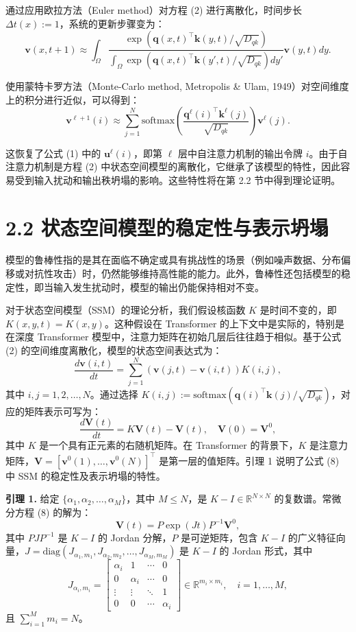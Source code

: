 \documentclass[lang=cn,a4paper,newtx]{elegantpaper}
\begin{document}
通过应用欧拉方法（Euler method）对方程 (2) 进行离散化，时间步长 $\Delta t(x) := 1$，系统的更新步骤变为：
\[
\mathbf{v}(x, t + 1) \approx 
\int_\Omega \frac{\exp(\mathbf{q}(x, t)^\top \mathbf{k}(y, t)/\sqrt{D_{qk}})}
{\int_\Omega \exp(\mathbf{q}(x, t)^\top \mathbf{k}(y', t)/\sqrt{D_{qk}}) dy'} 
\mathbf{v}(y, t) dy. \tag{7}
\]

使用蒙特卡罗方法（Monte-Carlo method, Metropolis \& Ulam, 1949）对空间维度上的积分进行近似，可以得到：
\[
\mathbf{v}^{\ell+1}(i) \approx \sum_{j=1}^N 
\text{softmax}\left( \frac{\mathbf{q}^\ell(i)^\top \mathbf{k}^\ell(j)}{\sqrt{D_{qk}}} \right) \mathbf{v}^\ell(j).
\]

这恢复了公式 (1) 中的 $\mathbf{u}^\ell(i)$，即第 $\ell$ 层中自注意力机制的输出令牌 $i$。由于自注意力机制是方程 (2) 中状态空间模型的离散化，它继承了该模型的特性，因此容易受到输入扰动和输出秩坍塌的影响。这些特性将在第 2.2 节中得到理论证明。

\section*{2.2 状态空间模型的稳定性与表示坍塌}

模型的鲁棒性指的是其在面临不确定或具有挑战性的场景（例如噪声数据、分布偏移或对抗性攻击）时，仍然能够维持高性能的能力。此外，鲁棒性还包括模型的稳定性，即当输入发生扰动时，模型的输出仍能保持相对不变。

对于状态空间模型（SSM）的理论分析，我们假设核函数 $K$ 是时间不变的，即 $K(x, y, t) = K(x, y)$。这种假设在 Transformer 的上下文中是实际的，特别是在深度 Transformer 模型中，注意力矩阵在初始几层后往往趋于相似。基于公式 (2) 的空间维度离散化，模型的状态空间表达式为：
\[
\frac{d\mathbf{v}(i, t)}{dt} = \sum_{j=1}^N (\mathbf{v}(j, t) - \mathbf{v}(i, t))K(i, j),
\]
其中 $i, j = 1, 2, \dots, N$。通过选择 $K(i, j) := \text{softmax}(\mathbf{q}(i)^\top \mathbf{k}(j) / \sqrt{D_{qk}})$，对应的矩阵表示可写为：
\[
\frac{d\mathbf{V}(t)}{dt} = K\mathbf{V}(t) - \mathbf{V}(t), \quad \mathbf{V}(0) = \mathbf{V}^0, \tag{8}
\]
其中 $K$ 是一个具有正元素的右随机矩阵。在 Transformer 的背景下，$K$ 是注意力矩阵，$\mathbf{V} = [\mathbf{v}^0(1), \dots, \mathbf{v}^0(N)]^\top$ 是第一层的值矩阵。引理 1 说明了公式 (8) 中 SSM 的稳定性及表示坍塌的特性。

\textbf{引理 1.} 给定 $\{\alpha_1, \alpha_2, \dots, \alpha_M\}$，其中 $M \leq N$，是 $K - I \in \mathbb{R}^{N \times N}$ 的复数谱。常微分方程 (8) 的解为：
\[
\mathbf{V}(t) = P\exp(Jt)P^{-1}\mathbf{V}^0, \tag{9}
\]
其中 $PJP^{-1}$ 是 $K - I$ 的 Jordan 分解，$P$ 是可逆矩阵，包含 $K - I$ 的广义特征向量，$J = \text{diag}(J_{\alpha_1, m_1}, J_{\alpha_2, m_2}, \dots, J_{\alpha_M, m_M})$ 是 $K - I$ 的 Jordan 形式，其中
\[
J_{\alpha_i, m_i} = 
\begin{bmatrix}
\alpha_i & 1 & \cdots & 0 \\
0 & \alpha_i & \cdots & 0 \\
\vdots & \vdots & \ddots & 1 \\
0 & 0 & \cdots & \alpha_i
\end{bmatrix} \in \mathbb{R}^{m_i \times m_i}, \quad i = 1, \dots, M,
\]
且 $\sum_{i=1}^M m_i = N$。
\end{document}

